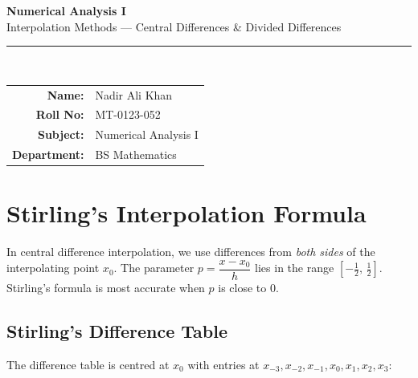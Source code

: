 \documentclass[12pt]{article}
\begin{document}
\thispagestyle{empty}

\begin{tcolorbox}[
  enhanced, arc=0pt, boxrule=0pt,
  colback=primary, colframe=primary,
  left=16pt, right=16pt, top=20pt, bottom=16pt,
  borderline south={4pt}{0pt}{accent},
]
  \centering
  {\huge\bfseries\color{white} Numerical Analysis I}\\[4pt]
  {\large\color{accent} Interpolation Methods --- Central Differences \& Divided Differences}\\[10pt]
  \color{lightbg}\rule{0.55\textwidth}{0.4pt}\\[10pt]
  \begin{tabular}{rl}
    {\color{lightbg}\textbf{Name:}}       & {\color{white} Nadir Ali Khan} \\[3pt]
    {\color{lightbg}\textbf{Roll No:}}    & {\color{white} MT-0123-052} \\[3pt]
    {\color{lightbg}\textbf{Subject:}}    & {\color{white} Numerical Analysis I} \\[3pt]
    {\color{lightbg}\textbf{Department:}} & {\color{white} BS Mathematics} \\
  \end{tabular}
\end{tcolorbox}

\vspace{12pt}

\section{Stirling's Interpolation Formula}

\begin{defbox}
In central difference interpolation, we use differences from \emph{both sides} of the interpolating point $x_0$.
The parameter $p = \dfrac{x - x_0}{h}$ lies in the range $[-\tfrac{1}{2},\, \tfrac{1}{2}]$.
Stirling's formula is most accurate when $p$ is close to $0$.
\end{defbox}

\subsection*{Stirling's Difference Table}

The difference table is centred at $x_0$ with entries at $x_{-3}, x_{-2}, x_{-1}, x_0, x_1, x_2, x_3$:
\end{document}
